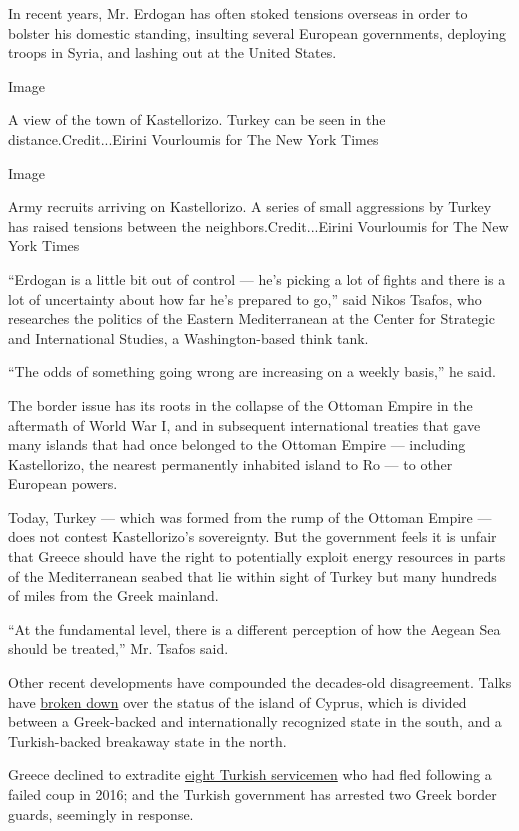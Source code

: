 In recent years, Mr. Erdogan has often stoked tensions overseas in order
to bolster his domestic standing, insulting several European
governments, deploying troops in Syria, and lashing out at the United
States.

Image

A view of the town of Kastellorizo. Turkey can be seen in the
distance.Credit...Eirini Vourloumis for The New York Times

Image

Army recruits arriving on Kastellorizo. A series of small aggressions by
Turkey has raised tensions between the neighbors.Credit...Eirini
Vourloumis for The New York Times

``Erdogan is a little bit out of control --- he's picking a lot of
fights and there is a lot of uncertainty about how far he's prepared to
go,'' said Nikos Tsafos, who researches the politics of the Eastern
Mediterranean at the Center for Strategic and International Studies, a
Washington-based think tank.

``The odds of something going wrong are increasing on a weekly basis,''
he said.

The border issue has its roots in the collapse of the Ottoman Empire in
the aftermath of World War I, and in subsequent international treaties
that gave many islands that had once belonged to the Ottoman Empire ---
including Kastellorizo, the nearest permanently inhabited island to Ro
--- to other European powers.

Today, Turkey --- which was formed from the rump of the Ottoman Empire
--- does not contest Kastellorizo's sovereignty. But the government
feels it is unfair that Greece should have the right to potentially
exploit energy resources in parts of the Mediterranean seabed that lie
within sight of Turkey but many hundreds of miles from the Greek
mainland.

``At the fundamental level, there is a different perception of how the
Aegean Sea should be treated,'' Mr. Tsafos said.

Other recent developments have compounded the decades-old disagreement.
Talks have
\href{https://www.nytimes3xbfgragh.onion/2017/07/07/world/europe/cyprus-reunification-turkey-talks-fail.html}{broken
down} over the status of the island of Cyprus, which is divided between
a Greek-backed and internationally recognized state in the south, and a
Turkish-backed breakaway state in the north.

Greece declined to extradite
\href{https://www.nytimes3xbfgragh.onion/2017/01/26/world/europe/greece-turkey-soldiers-extradition.html}{eight
Turkish servicemen} who had fled following a failed coup in 2016; and
the Turkish government has arrested two Greek border guards, seemingly
in response.

